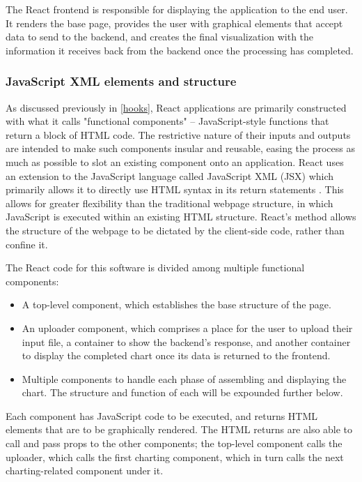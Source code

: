 The React frontend is responsible for displaying the application to the end user. It renders the base page, provides the user with graphical elements that accept data to send to the backend, and creates the final visualization with the information it receives back from the backend once the processing has completed.

\subsubsection{JavaScript XML elements and structure}

As discussed previously in \autoref{hooks}, React applications are primarily constructed with what it calls "functional components" -- JavaScript-style functions that return a block of HTML code. The restrictive nature of their inputs and outputs are intended to make such components insular and reusable, easing the process as much as possible to slot an existing component onto an application. React uses an extension to the JavaScript language called JavaScript XML (JSX) which primarily allows it to directly use HTML syntax in its return statements \cite{adedeji_full-stack_2023}. This allows for greater flexibility than the traditional webpage structure, in which JavaScript is executed within an existing HTML structure. React's method allows the structure of the webpage to be dictated by the client-side code, rather than confine it.

The React code for this software is divided among multiple functional components: 

\begin{itemize}
	\item A top-level component, which establishes the base structure of the page.
	\item An uploader component, which comprises a place for the user to upload their input file, a container to show the backend's response, and another container to display the completed chart once its data is returned to the frontend.
	\item Multiple components to handle each phase of assembling and displaying the chart. The structure and function of each will be expounded further below.
\end{itemize}

Each component has JavaScript code to be executed, and returns HTML elements that are to be graphically rendered. The HTML returns are also able to call and pass props to the other components; the top-level component calls the uploader, which calls the first charting component, which in turn calls the next charting-related component under it.

